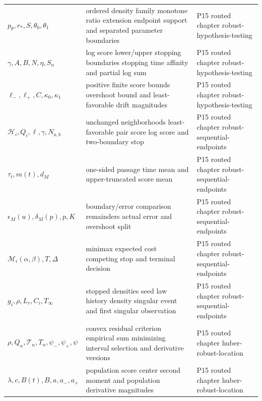 \begin{longtable}{@{}p{}p{}p{}@{}}
\(p_\theta,\allowbreak r_*,\allowbreak S,\allowbreak \theta_0,\allowbreak \theta_1\) & ordered density family monotone ratio extension endpoint support and separated parameter boundaries & P15 routed chapter robust-\allowbreak{}hypothesis-\allowbreak{}testing \\
\(\gamma,\allowbreak A,\allowbreak B,\allowbreak N,\allowbreak \eta,\allowbreak S_n\) & log score lower/upper stopping boundaries stopping time affinity and partial log sum & P15 routed chapter robust-\allowbreak{}hypothesis-\allowbreak{}testing \\
\(\ell_-,\allowbreak \ell_+,\allowbreak C,\allowbreak \kappa_0,\allowbreak \kappa_1\) & positive finite score bounds overshoot bound and least-favorable drift magnitudes & P15 routed chapter robust-\allowbreak{}hypothesis-\allowbreak{}testing \\
\(\mathcal H_i,\allowbreak Q_i,\allowbreak \ell,\allowbreak \gamma,\allowbreak N_{a,b}\) & unchanged neighborhoods least-favorable pair score log score and two-boundary stop & P15 routed chapter robust-\allowbreak{}sequential-\allowbreak{}endpoints \\
\(\tau_t,\allowbreak m(t),\allowbreak d_M\) & one-sided passage time mean and upper-truncated score mean & P15 routed chapter robust-\allowbreak{}sequential-\allowbreak{}endpoints \\
\(\epsilon_M(u),\allowbreak \delta_M(p),\allowbreak p,\allowbreak K\) & boundary/error comparison remainders actual error and overshoot split & P15 routed chapter robust-\allowbreak{}sequential-\allowbreak{}endpoints \\
\(\mathcal M_i(\alpha,\allowbreak \beta),\allowbreak T,\allowbreak \Delta\) & minimax expected cost competing stop and terminal decision & P15 routed chapter robust-\allowbreak{}sequential-\allowbreak{}endpoints \\
\(g_i,\allowbreak \rho,\allowbreak L_r,\allowbreak C_i,\allowbreak T_\infty\) & stopped densities seed law history density singular event and first singular observation & P15 routed chapter robust-\allowbreak{}sequential-\allowbreak{}endpoints \\
\(\rho,\allowbreak Q_n,\allowbreak \mathcal T_n,\allowbreak T_n,\allowbreak \psi_-,\allowbreak \psi_+,\allowbreak \psi\) & convex residual criterion empirical sum minimizing interval selection and derivative versions & P15 routed chapter huber-\allowbreak{}robust-\allowbreak{}location \\
\(\lambda,\allowbreak c,\allowbreak B(t),\allowbreak B,\allowbreak a,\allowbreak a_-,\allowbreak a_+\) & population score center second moment and population derivative magnitudes & P15 routed chapter huber-\allowbreak{}robust-\allowbreak{}location \\

\end{longtable}
